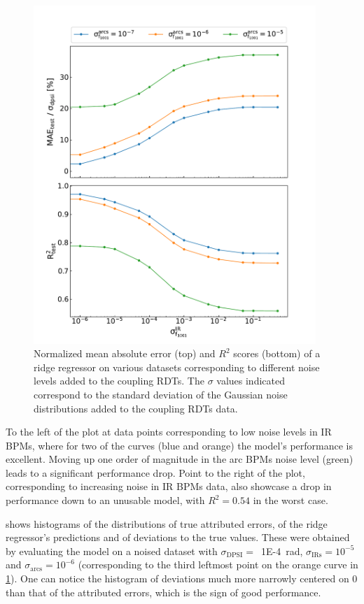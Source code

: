 \begin{figure}[!htb]
    \centering
    \includegraphics*[width=0.95\textwidth]{Figures/ML_for_IR_Coupling/ml_ridge_performance.pdf}
    \caption{Normalized mean absolute error (top) and \(R^2\) scores (bottom) of a ridge regressor on various datasets corresponding to different noise levels added to the coupling RDTs. The \(\sigma\) values indicated correspond to the standard deviation of the Gaussian noise distributions added to the coupling RDTs data.}
    \label{figure:ridge_performance}
\end{figure}

To the left of the plot at data points corresponding to low noise levels in IR BPMs, where for two of the curves (\textcolor{mplblue}{blue} and \textcolor{mplorange}{orange}) the model's performance is excellent.
Moving up one order of magnitude in the arc BPMs noise level (\textcolor{mplgreen}{green}) leads to a significant performance drop.
Point to the right of the plot, corresponding to increasing noise in IR BPMs data, also showcase a drop in performance down to an unusable model, with \(R^2 = 0.54\) in the worst case.

 shows histograms of the distributions of true attributed errors, of the ridge regressor's predictions and of deviations to the true values.
These were obtained by evaluating the model on a noised dataset with \(\sigma_{\mathrm{DPSI}} =\)~\qty{1E-4}{\radian}, \(\sigma_{\mathrm{IRs}} = 10^{-5}\) and \(\sigma_{\mathrm{arcs}} = 10^{-6}\) (corresponding to the third leftmost point on the \textcolor{mplorange}{orange} curve in \cref{figure:ridge_performance}).
One can notice the histogram of deviations much more narrowly centered on \num{0} than that of the attributed errors, which is the sign of good performance.

